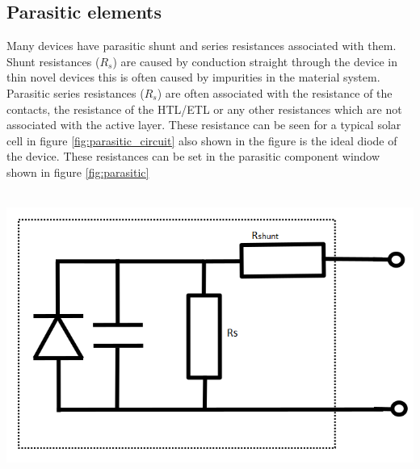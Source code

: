 \newpage
\subsection{Parasitic elements}
\label{sec:parasitic}

Many devices have parasitic shunt and series resistances associated with them.  Shunt resistances ($R_{s}$) are caused by conduction straight through the device in thin novel devices this is often caused by impurities in the material system.  Parasitic series resistances ($R_{s}$) are often associated with the resistance of the contacts, the resistance of the HTL/ETL or any other resistances which are not associated with the active layer.  These resistance can be seen for a typical solar cell in figure \ref{fig:parasitic_circuit} also shown in the figure is the ideal diode of the device. These resistances can be set in the parasitic component window shown in figure \ref{fig:parasitic}
\\
\\
\noindent
\begin{minipage}{0.45\textwidth}
\centering
\includegraphics[width=\textwidth,height=0.7\textwidth]{./images/running/parasitic_circuit.png}
\label{fig:parasitic_circuit}
\end{minipage}
\hspace*{10px}
